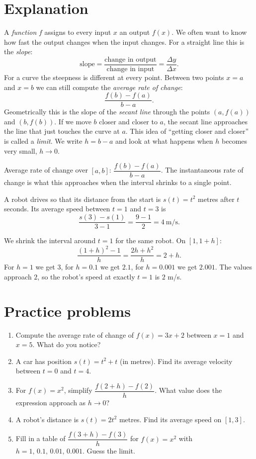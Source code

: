 \label{ch:rate}

\section*{Explanation}
A \emph{function} $f$ assigns to every input $x$ an output $f(x)$. We often want to know how fast the output changes when the input changes. For a straight line this is the \emph{slope}:
\[
\text{slope} = \frac{\text{change in output}}{\text{change in input}} = \frac{\Delta y}{\Delta x}.
\]
For a curve the steepness is different at every point. Between two points $x=a$ and $x=b$ we can still compute the \emph{average rate of change}:
\[
\frac{f(b)-f(a)}{b-a}.
\]
Geometrically this is the slope of the \emph{secant line} through the points $(a,f(a))$ and $(b,f(b))$. If we move $b$ closer and closer to $a$, the secant line approaches the line that just touches the curve at $a$. This idea of ``getting closer and closer'' is called a \emph{limit}. We write $h = b-a$ and look at what happens when $h$ becomes very small, $h\to 0$.

\begin{keyidea}
Average rate of change over $[a,b]$: $\dfrac{f(b)-f(a)}{b-a}$. The instantaneous rate of change is what this approaches when the interval shrinks to a single point.
\end{keyidea}

\begin{example}
A robot drives so that its distance from the start is $s(t)=t^2$ metres after $t$ seconds. Its average speed between $t=1$ and $t=3$ is
\[
\frac{s(3)-s(1)}{3-1}=\frac{9-1}{2}=4\ \text{m/s}.
\]
\end{example}

\begin{example}
We shrink the interval around $t=1$ for the same robot. On $[1,1+h]$:
\[
\frac{(1+h)^2-1}{h}=\frac{2h+h^2}{h}=2+h.
\]
For $h=1$ we get $3$, for $h=0.1$ we get $2.1$, for $h=0.001$ we get $2.001$. The values approach $2$, so the robot's speed at exactly $t=1$ is $2$ m/s.
\end{example}

\section*{Practice problems}
\begin{enumerate}[label=\textbf{\thechapter.\arabic*}]
  \item Compute the average rate of change of $f(x)=3x+2$ between $x=1$ and $x=5$. What do you notice?
  \item A car has position $s(t)=t^2+t$ (in metres). Find its average velocity between $t=0$ and $t=4$.
  \item For $f(x)=x^2$, simplify $\dfrac{f(2+h)-f(2)}{h}$. What value does the expression approach as $h\to0$?
  \item A robot's distance is $s(t)=2t^2$ metres. Find its average speed on $[1,3]$.
  \item[\textbf{\thechapter.5}$\star$] Fill in a table of $\dfrac{f(3+h)-f(3)}{h}$ for $f(x)=x^2$ with $h=1,\,0.1,\,0.01,\,0.001$. Guess the limit.
\end{enumerate}

